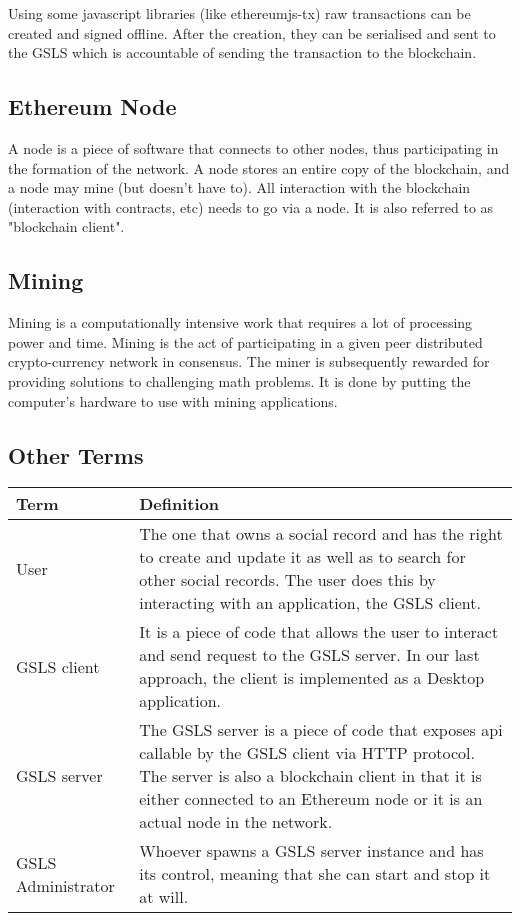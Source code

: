 Using some javascript libraries (like ethereumjs-tx) raw transactions can be created and signed offline. After the creation, they can be serialised and sent to the GSLS which is accountable of sending the transaction to the blockchain.

\subsection*{Ethereum Node}
A node is a piece of software that connects to other nodes, thus participating in the formation of the network. A node stores an entire copy of the blockchain, and a node may mine (but doesn't have to). All interaction with the blockchain (interaction with contracts, etc) needs to go via a node. It is also referred to as "blockchain client".

\subsection*{Mining}
Mining is a computationally intensive work that requires a lot of processing power and time. Mining is the act of participating in a given peer distributed crypto-currency network in consensus. The miner is subsequently rewarded for providing solutions to challenging math problems. It is done by putting the computer's hardware to use with mining applications.

\subsection*{Other Terms}
\begin{center}
 \begin{tabular}{| l | p{10cm} |}
 \hline
 \textbf{Term} & \textbf{Definition} \\
 \hline
User & The one that owns a social record and has the right to create and update it as well as to search for other social records. The user does this by interacting with an application, the GSLS client. \\
 \hline
 GSLS client & It is a piece of code that allows the user to interact and send request to the GSLS server. In our last approach, the client is implemented as a Desktop application. \\
 \hline
 GSLS server & The GSLS server is a piece of code that exposes api callable by the GSLS client via HTTP protocol. The server is also a blockchain client in that it is either connected to an Ethereum node or it is an actual node in the network. \\
 \hline
 GSLS Administrator & Whoever spawns a GSLS server instance and has its control, meaning that she can start and stop it at will. \\
 \hline
\end{tabular}
\end{center}

